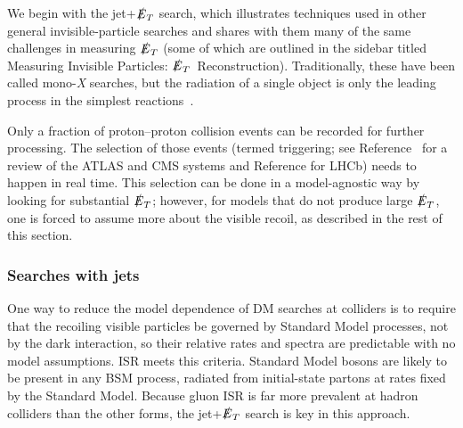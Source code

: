 \documentclass{ar-1col}
\newcommand{\MET}{\ensuremath{\slashed{E}_T}\xspace}
\begin{document}
{We begin with the jet+\MET search, which illustrates
techniques used in other general invisible-particle searches and
shares with them many of the same challenges in measuring \MET
(some of which are outlined in the sidebar titled Measuring Invisible Particles: \MET\ Reconstruction).
Traditionally, these
have been called mono-\textit{X} searches, but the radiation of a single
object is only the leading process in the simplest
reactions~\cite{Haisch:2013ata}.

Only a fraction of proton--proton collision events can be recorded for
further processing. The selection of those events (termed triggering; see Reference~
for a review of the ATLAS and CMS systems and Reference  for LHCb)
needs to happen in real time. This selection can be done in a model-agnostic way by looking
for substantial \MET; however, for models that do not
produce large \MET, one is forced to assume more about the visible
recoil, as described in the rest of this section. 

\subsubsection{Searches with jets}\label{sub:monojet}

One way to reduce the model dependence of DM searches at colliders is to
require that the recoiling visible particles be governed by Standard Model
processes, not by the dark interaction, so their relative rates and spectra are predictable
with no model assumptions. ISR meets this criteria.
Standard Model bosons are likely to be present in any BSM process, radiated
from initial-state partons at rates fixed by the Standard Model. Because gluon
ISR is far more prevalent at hadron colliders than the other forms, the jet+\MET
search is key in this approach.

}
\end{document}
